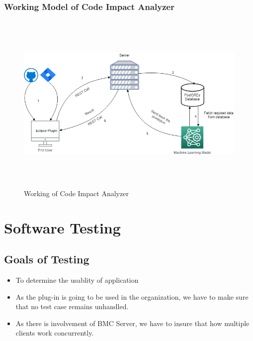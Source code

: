 \documentclass[oneside,a4paper,12pt]{book}
\begin{document}
\subsection{Working Model of Code Impact Analyzer}

\begin{figure}[H]
	\begin{Center}
		\includegraphics[width=6in,height=3.47in,scale=1.5]{Working.png}
		\caption{Working of Code Impact Analyzer}
		\label{fig:Working of Code Impact Analyzer}
	\end{Center}
\end{figure}


\newpage
\chapter{Software Testing}

\section{Goals of Testing}
\begin{itemize}
    \item To determine the usablity of application\par
    \item As the plug-in is going to be used in the organization, we have to make sure that no test case remains unhandled.\par
    
    \item As there is involvement of BMC Server, we have to insure that how multiple clients work concurrently.\par
\end{itemize}
\end{document}
